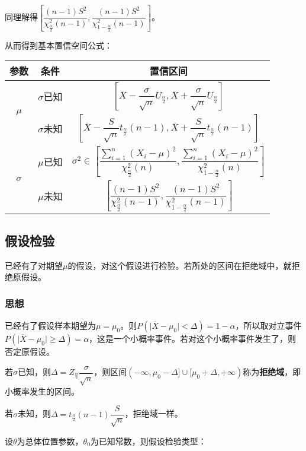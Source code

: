 \documentclass[UTF8, 12pt]{ctexart}
\begin{document}
同理解得$\left[\dfrac{(n-1)S^2}{\chi^2_{\frac{\alpha}{2}}(n-1)},\dfrac{(n-1)S^2}{\chi^2_{1-\frac{\alpha}{2}}(n-1)}\right]$。\medskip

从而得到基本置信空间公式：

\begin{tabular}{|c|c|c|}
    \hline
    参数 & 条件 & 置信区间 \\ \hline
    \multirow{2}{*}{$\mu$} & $\sigma$已知 & $\left[\overline{X}-\dfrac{\sigma}{\sqrt{n}}U_{\frac{\alpha}{2}},\overline{X}+\dfrac{\sigma}{\sqrt{n}}U_{\frac{\alpha}{2}}\right]$ \\ \cline{2-3}
    & $\sigma$未知 & $\left[\overline{X}-\dfrac{S}{\sqrt{n}}t_{\frac{\alpha}{2}}(n-1),\overline{X}+\dfrac{S}{\sqrt{n}}t_{\frac{\alpha}{2}}(n-1)\right]$ \\ \hline
    \multirow{2}{*}{$\sigma$} & $\mu$已知 & $\sigma^2\in\left[\dfrac{\sum\limits_{i=1}^n(X_i-\mu)^2}{\chi^2_\frac{\alpha}{2}(n)},\dfrac{\sum\limits_{i=1}^n(X_i-\mu)^2}{\chi^2_{1-\frac{\alpha}{2}}(n)}\right]$ \\ \cline{2-3}
    & $\mu$未知 & $\left[\dfrac{(n-1)S^2}{\chi^2_{\frac{\alpha}{2}}(n-1)},\dfrac{(n-1)S^2}{\chi^2_{1-\frac{\alpha}{2}}(n-1)}\right]$ \\ \hline
\end{tabular}

\subsection{假设检验}

已经有了对期望$\mu$的假设，对这个假设进行检验。若所处的区间在拒绝域中，就拒绝原假设。

\subsubsection{思想}

已经有了假设样本期望为$\mu=\mu_0$。则$P(\vert\overline{X}-\mu_0\vert<\Delta)=1-\alpha$，所以取对立事件$P(\vert\overline{X}-\mu_0\vert\geqslant\Delta)=\alpha$，这是一个小概率事件。若对这个小概率事件发生了，则否定原假设。

若$\sigma$已知，则$\Delta=Z_\frac{\alpha}{2}\dfrac{\sigma}{\sqrt{n}}$，则区间$(-\infty,\mu_0-\Delta]\cup[\mu_0+\Delta,+\infty)$称为\textbf{拒绝域}，即小概率发生的区间。

若$\sigma$未知，则$\Delta=t_\frac{\alpha}{2}(n-1)\dfrac{S}{\sqrt{n}}$，拒绝域一样。

设$\theta$为总体位置参数，$\theta_0$为已知常数，则假设检验类型：\medskip
\end{document}
